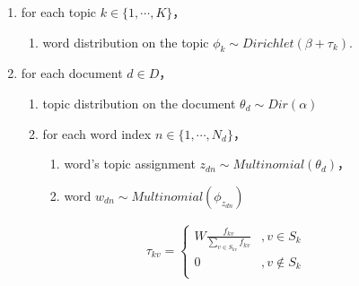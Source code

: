 \documentclass{sig-alternate-05-2015}
\begin{document}
\begin{enumerate}[noitemsep]
    \item for each topic \(k \in \{1,\cdots,K\}\)，
    \begin{enumerate}
        \item word distribution on the topic \(\phi_k \sim Dirichlet(\beta+\tau_k)\).
    \end{enumerate}
    \item for each document \(d \in D\)，
    \begin{enumerate}
        \item topic distribution on the document \(\theta_d \sim Dir(\alpha)\)
        \item for each word index \(n \in \{1,\cdots,N_d\}\)，
        \begin{enumerate}
            \item word's topic assignment \(z_{dn} \sim Multinomial(\theta_d)\)，
            \item word \(w_{dn} \sim Multinomial(\phi_{z_{dn}})\)
        \end{enumerate}
    \end{enumerate}
\end{enumerate}

\begin{equation}
\label{eq:wikiPrior}
\begin{aligned}
\tau_{kv}=
\left\{ \begin{aligned}
W \frac{f_{kv}}{\sum_{v\in S_{kv}}f_{kv}} &,v\in S_{k} \\
0&,v \notin S_{k}\\
\end{aligned}\right.
\end{aligned}
\end{equation}
\end{document}

